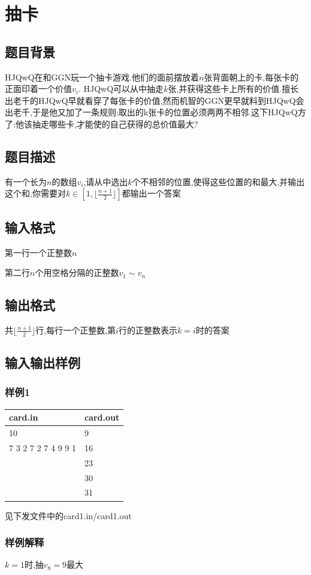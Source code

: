 \documentclass[12pt]{ctexart}
\begin{document}
	\section{抽卡}
	\subsection{题目背景}
	HJQwQ在和GGN玩一个抽卡游戏.他们的面前摆放着$n$张背面朝上的卡,每张卡的正面印着一个价值$v_i$. HJQwQ可以从中抽走$k$张,并获得这些卡上所有的价值.擅长出老千的HJQwQ早就看穿了每张卡的价值,然而机智的GGN更早就料到HJQwQ会出老千,于是他又加了一条规则:取出的k张卡的位置必须两两不相邻.这下HJQwQ方了:他该抽走哪些卡,才能使的自己获得的总价值最大?
	\subsection{题目描述}
	有一个长为$n$的数组$v_i$,请从中选出$k$个不相邻的位置,使得这些位置的和最大,并输出这个和,你需要对$k\in\left[1,\lfloor\frac{n+1}2\rfloor\right]$都输出一个答案
	\subsection{输入格式}
	第一行一个正整数$n$

	第二行$n$个用空格分隔的正整数$v_1\sim v_n$
	\subsection{输出格式}
	共$\lfloor\frac{n+1}2\rfloor$行,每行一个正整数,第$i$行的正整数表示$k=i$时的答案
	\subsection{输入输出样例}
	\subsubsection{样例1}
	\begin{center}
		\begin{tabular}{|p{6cm}|p{6cm}|}
			\hline card.in&card.out\\
			\hline	10&9\\
					7 3 2 7 2 7 4 9 9 1&16\\
					&23\\
					&30\\
					&31\\
			\hline
		\end{tabular}
	\end{center}
	见下发文件中的card1.in/card1.out
	\subsubsection{样例解释}
	$k=1$时,抽$v_8=9$最大
\end{document}
